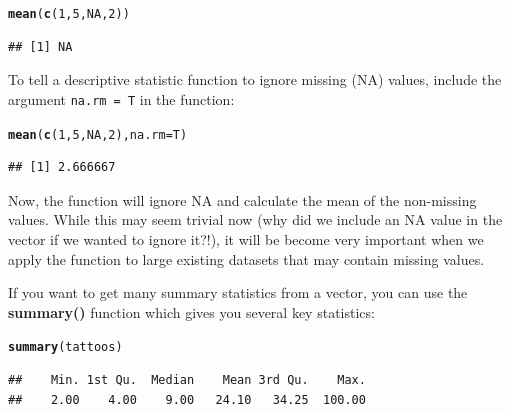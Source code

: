 \documentclass{tufte-book}\usepackage[]{graphicx}\usepackage[]{color}
\makeatletter
\newcommand{\hlnum}[1]{\textcolor[rgb]{0.686,0.059,0.569}{#1}}%
\newcommand{\hlstd}[1]{\textcolor[rgb]{0.345,0.345,0.345}{#1}}%
\newcommand{\hlkwc}[1]{\textcolor[rgb]{0.333,0.667,0.333}{#1}}%
\newcommand{\hlkwd}[1]{\textcolor[rgb]{0.737,0.353,0.396}{\textbf{#1}}}%
\newenvironment{kframe}{%
 \def\at@end@of@kframe{}%
 \ifinner\ifhmode%
  \def\at@end@of@kframe{\end{minipage}}%
  \begin{minipage}{\columnwidth}%
 \fi\fi%
 \def\FrameCommand##1{\hskip\@totalleftmargin \hskip-\fboxsep
 \colorbox{shadecolor}{##1}\hskip-\fboxsep
     \hskip-\linewidth \hskip-\@totalleftmargin \hskip\columnwidth}%
 \MakeFramed {\advance\hsize-\width
   \@totalleftmargin\z@ \linewidth\hsize
   \@setminipage}}%
 {\par\unskip\endMakeFramed%
 \at@end@of@kframe}
\newenvironment{knitrout}{}{} %
\makeatother
\begin{document}

\begin{knitrout}
\color{fgcolor}\begin{kframe}
\begin{alltt}
\hlkwd{mean}\hlstd{(}\hlkwd{c}\hlstd{(}\hlnum{1}\hlstd{,} \hlnum{5}\hlstd{,} \hlnum{NA}\hlstd{,} \hlnum{2}\hlstd{))}
\end{alltt}
\begin{verbatim}
## [1] NA
\end{verbatim}
\end{kframe}
\end{knitrout}

To tell a descriptive statistic function to ignore missing (NA) values, include the argument \texttt{na.rm = T} in the function:

\begin{knitrout}
\color{fgcolor}\begin{kframe}
\begin{alltt}
\hlkwd{mean}\hlstd{(}\hlkwd{c}\hlstd{(}\hlnum{1}\hlstd{,} \hlnum{5}\hlstd{,} \hlnum{NA}\hlstd{,} \hlnum{2}\hlstd{),} \hlkwc{na.rm} \hlstd{= T)}
\end{alltt}
\begin{verbatim}
## [1] 2.666667
\end{verbatim}
\end{kframe}
\end{knitrout}

Now, the function will ignore NA and calculate the mean of the non-missing values. While this may seem trivial now (why did we include an NA value in the vector if we wanted to ignore it?!), it will be become very important when we apply the function to large existing datasets that may contain missing values.

If you want to get many summary statistics from a vector, you can use the \textbf{summary()} function which gives you several key statistics:

\begin{footnotesize}
\begin{knitrout}
\color{fgcolor}\begin{kframe}
\begin{alltt}
\hlkwd{summary}\hlstd{(tattoos)}
\end{alltt}
\begin{verbatim}
##    Min. 1st Qu.  Median    Mean 3rd Qu.    Max. 
##    2.00    4.00    9.00   24.10   34.25  100.00
\end{verbatim}
\end{kframe}
\end{knitrout}
\end{footnotesize}
\end{document}
